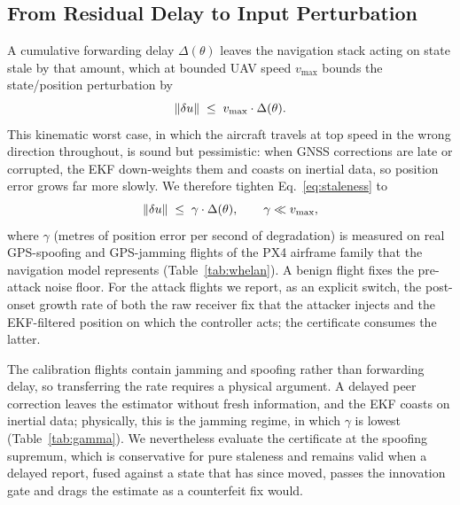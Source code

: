 \subsection{From Residual Delay to Input Perturbation}
A cumulative forwarding delay $\Delta(\theta)$ leaves the navigation stack
acting on state stale by that amount, which at bounded UAV speed $v_{\max}$
bounds the state/position perturbation by
\begin{equation}
\label{eq:staleness}
\left\lVert \delta u\right\rVert \;\le\; v_{\max}\cdot \Delta(\theta).
\end{equation}
This kinematic worst case, in which the aircraft travels at top speed in the
wrong direction throughout, is sound but pessimistic: when GNSS corrections are
late or corrupted, the EKF down-weights them and coasts on inertial data, so
position error grows far more slowly. We therefore tighten
Eq.~\eqref{eq:staleness} to
\begin{equation}
\label{eq:gamma}
\left\lVert \delta u\right\rVert\;\le\;\gamma\cdot\Delta(\theta),\qquad \gamma\ll v_{\max},
\end{equation}
where $\gamma$ (metres of position error per second of degradation) is measured
on real GPS-spoofing and GPS-jamming flights of the PX4 airframe family that
the navigation model represents (Table~\ref{tab:whelan}). A benign flight fixes
the pre-attack noise floor. For the attack flights we report, as an explicit
switch, the post-onset growth rate of both the raw receiver fix that the
attacker injects and the EKF-filtered position on which the controller acts;
the certificate consumes the latter.

The calibration flights contain jamming and spoofing rather than forwarding
delay, so transferring the rate requires a physical argument. A delayed peer
correction leaves the estimator without fresh information, and the EKF coasts
on inertial data; physically, this is the jamming regime, in which $\gamma$ is
lowest (Table~\ref{tab:gamma}). We nevertheless evaluate the certificate at the
spoofing supremum, which is conservative for pure staleness and remains valid
when a delayed report, fused against a state that has since moved, passes the
innovation gate and drags the estimate as a counterfeit fix would.

\begin{table}[t]
\centering
\caption{The measured delay-to-position rate $\gamma$ from three real PX4
flights (one benign reference, one GPS-jamming, one GPS-spoofing) in the
, self-referenced to the pre-attack median.
``noise'' is the $95$th percentile of pre-attack position error;
$\gamma_{\mathrm{lsq}}$ and $\gamma_{\mathrm{peak}}$ are the least-squares and
peak-secant growth rates after attack onset. The flights serve as same-platform
calibration data for $\gamma$; they are not released as pairing records
(\S\ref{sec:provenance_dist}).}
\label{tab:whelan}
\scriptsize
\renewcommand{\arraystretch}{1.1}

\end{table}

